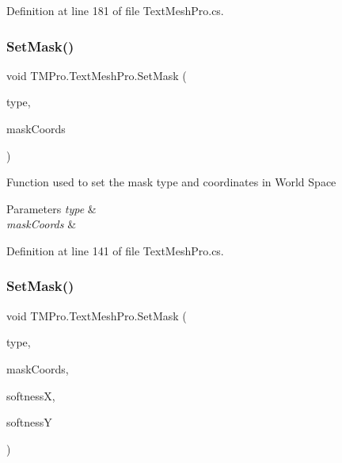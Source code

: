 Definition at line 181 of file Text\+Mesh\+Pro.\+cs.

\mbox{\label{class_t_m_pro_1_1_text_mesh_pro_ae6c2606deaf5123ee63defb1582cbc50}} 
\subsubsection{\texorpdfstring{SetMask()}{SetMask()}\hspace{0.1cm}{\footnotesize\ttfamily [1/2]}}
{\footnotesize\ttfamily void T\+M\+Pro.\+Text\+Mesh\+Pro.\+Set\+Mask (\begin{DoxyParamCaption}\item[{\mbox{\hyperlink{namespace_t_m_pro_adca59e3caf7e75b8dfdcac4f70a31987}{Masking\+Types}}}]{type,  }\item[{Vector4}]{mask\+Coords }\end{DoxyParamCaption})}



Function used to set the mask type and coordinates in World Space 


\begin{DoxyParams}{Parameters}
{\em type} & \\
\hline
{\em mask\+Coords} & \\
\hline
\end{DoxyParams}


Definition at line 141 of file Text\+Mesh\+Pro.\+cs.

\mbox{\label{class_t_m_pro_1_1_text_mesh_pro_a907c0bf8a284315eba6099f07dd98a38}} 
\subsubsection{\texorpdfstring{SetMask()}{SetMask()}\hspace{0.1cm}{\footnotesize\ttfamily [2/2]}}
{\footnotesize\ttfamily void T\+M\+Pro.\+Text\+Mesh\+Pro.\+Set\+Mask (\begin{DoxyParamCaption}\item[{\mbox{\hyperlink{namespace_t_m_pro_adca59e3caf7e75b8dfdcac4f70a31987}{Masking\+Types}}}]{type,  }\item[{Vector4}]{mask\+Coords,  }\item[{float}]{softnessX,  }\item[{float}]{softnessY }\end{DoxyParamCaption})}



